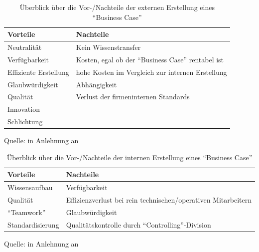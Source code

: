 \begin{table}[h!]
	\centering
	
	\begin{tabular}{@{}ll@{}}\toprule[1.5pt]
		
		\textbf{Vorteile} & \textbf{Nachteile} \\ \midrule
		
		Neutralität & Kein Wissenstransfer \\
		Verfügbarkeit & Kosten, egal ob der \enquote{Business Case} rentabel ist\\
		Effiziente Erstellung & hohe Kosten im Vergleich zur internen Erstellung \\
		Glaubwürdigkeit & Abhängigkeit \\
		Qualität & Verlust der firmeninternen Standards \\
		Innovation & \\
		Schlichtung & \\
		
		\bottomrule[1.5pt]
	\end{tabular}
	
	\caption{Überblick über die Vor-/Nachteile der externen Erstellung eines \enquote{Business Case}}
	{\footnotesize Quelle: in Anlehnung an \cite[][S.\,34]{brugger_it_2009}}
	\label{tab:externVorNachteile}
	
\end{table}

\begin{table}[h!]
	\centering
	
	\begin{tabular}{@{}ll@{}}\toprule[1.5pt]
		
		\textbf{Vorteile} & \textbf{Nachteile} \\ \midrule
		
		Wissensaufbau & Verfügbarkeit \\
		Qualität & Effizienzverlust bei rein technischen/operativen Mitarbeitern \\
		\enquote{Teamwork} & Glaubwürdigkeit \\
		Standardisierung & Qualitätskontrolle durch \enquote{Controlling}-Division \\
		
		\bottomrule[1.5pt]
	\end{tabular}
	
	\caption{Überblick über die Vor-/Nachteile der internen Erstellung eines \enquote{Business Case}}
	{\footnotesize Quelle: in Anlehnung an \cite[][S.\,34]{brugger_it_2009}}
	\label{tab:internVorNachteile}
	
\end{table}

